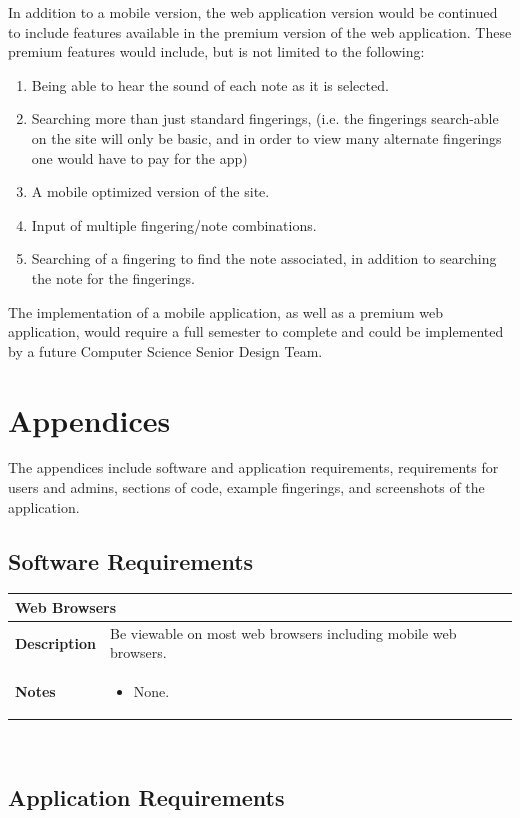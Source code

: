 \documentclass[12pt,english]{article}
\providecommand{\tabularnewline}{\\}
\providecommand{\tabularnewline}{\\}
\begin{document}
In addition to a mobile version, the web application version would
be continued to include features available in the premium version
of the web application. These premium features would include, but
is not limited to the following:
\begin{enumerate}
\item Being able to hear the sound of each note as it is selected. 
\item Searching more than just standard fingerings, (i.e. the fingerings
search-able on the site will only be basic, and in order to view many
alternate fingerings one would have to pay for the app) 
\item A mobile optimized version of the site. 
\item Input of multiple fingering/note combinations. 
\item Searching of a fingering to find the note associated, in addition
to searching the note for the fingerings. 
\end{enumerate}
The implementation of a mobile application, as well as a premium web
application, would require a full semester to complete and could be
implemented by a future Computer Science Senior Design Team. \clearpage{}


\section{Appendices}

The appendices include software and application requirements, requirements
for users and admins, sections of code, example fingerings, and screenshots
of the application.


\subsection{Software Requirements}

\begin{tabular}{|p{3cm}|p{13cm}|}
\hline 
\multicolumn{2}{|l|}{\textbf{Web Browsers}}\tabularnewline
\hline 
\textbf{Description}  & Be viewable on most web browsers including mobile web browsers. \tabularnewline
\hline 
\textbf{Notes}  & \begin{itemize}
\item None. \end{itemize}
\tabularnewline
\hline 
\end{tabular}\\[0.5cm]


\subsection{Application Requirements}
\end{document}
